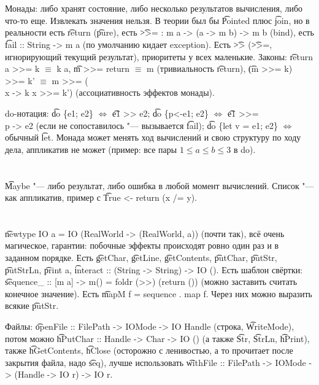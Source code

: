 \section{} %
Монады: либо хранят состояние, либо несколько результатов вычисления, либо что-то еще.
Извлекать значения нельзя.
В теории был бы \t{Pointed} плюс \t{join}, но в реальности есть \t{return} (\t{pure}),
есть \t{>>= : m a -> (a -> m b) -> m b} (bind), есть \t{fail :: String -> m a} (по умолчанию кидает exception).
Есть \t{>>} (\t{>>=}, игнорирующий текущий результат), приоритеты у всех маленькие.
Законы: \t{return a >>= k $\equiv$ k a}, \t{m >>= return $\equiv$ m} (тривиальность \t{return}), \t{(m >>= k) >>= k' $\equiv$ m >>= (\\x -> k x >>= k')}
(ассоциативность эффектов монады).

do-нотация: \t{do \{e1; e2\}} $\iff$ \t{e1 >> e2}; \t{do \{p<-e1; e2\}} $\iff$ \t{e1 >>= \\p -> e2} (если не сопоставилось "--- вызывается \t{fail}); \t{do \{let v = e1; e2\}} $\iff$ обычный \t{let}.
Монада может менять ход вычислений и свою структуру по ходу дела, аппликатив не может (пример: все пары $1 \le a \le b \le 3$ в do).

\section{} %
\t{Maybe} "--- либо результат, либо ошибка в любой момент вычислений.
Список "--- как аппликатив, пример с \t{True <- return (x /= y)}.

\section{} %
\t{newtype IO a = IO (RealWorld -> (RealWorld, a))} (почти так), всё очень магическое,
гарантии: побочные эффекты происходят ровно один раз и в заданном порядке.
Есть \t{getChar}, \t{getLine}, \t{getContents}, \t{putChar}, \t{putStr}, \t{putStrLn}, \t{print a},
\t{interact :: (String -> String) -> IO ()}.
Есть шаблон свёртки: \t{sequence\_ :: [m a] -> m() = foldr (>>) (return ())} (можно заставить считать конечное значение).
Есть \t{mapM f = sequence . map f}.
Через них можно выразить всякие \t{putStr}.

Файлы: \t{openFile :: FilePath -> IOMode -> IO Handle} (строка, \t{WriteMode}),
потом можно \t{hPutChar :: Handle -> Char -> IO ()} (а также \t{Str}, \t{StrLn}, \t{hPrint}),
также \t{hGetContents}, \t{hClose} (осторожно с ленивостью, а то прочитает после закрытия файла, надо \t{seq}),
лучше использовать \t{withFile :: FilePath -> IOMode -> (Handle -> IO r) -> IO r}.

